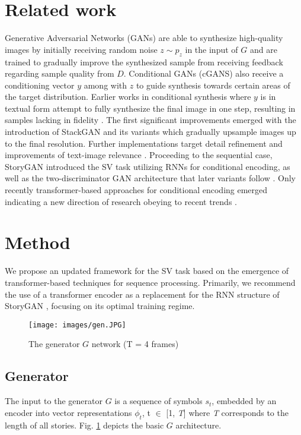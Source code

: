 \documentclass{article}
\begin{document}
\section{Related work}
\label{sec:literature}
Generative Adversarial Networks (GANs) \cite{goodfellow2014gans} are able to synthesize high-quality images by initially receiving random noise $z \sim  p_z$ in the input of $G$ and are trained to gradually improve the synthesized sample from receiving feedback regarding sample quality from $D$. Conditional GANs (cGANS) also receive a conditioning vector $y$ among with $z$ to guide synthesis towards certain areas of the target distribution. Earlier works in conditional synthesis where $y$ is in textual form attempt to fully synthesize the final image in one step, resulting in samples lacking in fidelity \cite{reed2016t2i}. The first significant improvements emerged with the introduction of StackGAN \cite{stackgan} and its variants \cite{zhang2018stackgan} which gradually upsample images up to the final resolution. Further implementations target detail refinement \cite{xu2018attngan, zhu2019dmgan} and improvements of text-image relevance \cite{segan}. Proceeding to the sequential case, StoryGAN \cite{storygan} introduced the SV task utilizing RNNs for conditional encoding, as well as the two-discriminator GAN architecture that later variants follow \cite{pororogan, li2020storygan}. Only recently transformer-based approaches for conditional encoding emerged \cite{Maharana2021ImprovingGA, Maharana2021IntegratingVL} indicating a new direction of research obeying to recent trends \cite{transformer}.

 
\section{Method}
\label{sec:method}
\label{sec:architecture}
We propose an updated framework for the SV task based on the emergence of transformer-based techniques for sequence processing. Primarily, we recommend the use of a transformer encoder \cite{transformer} as a replacement for the RNN structure of StoryGAN \cite{storygan}, focusing on its optimal training regime. 


\begin{figure}[b]
\centering
\texttt{[image: images/gen.JPG]}
\caption{The generator $G$ network (T = 4 frames)}
\label{fig:gen}
\end{figure}

\subsection{Generator}
The input to the generator $G$ is a sequence of symbols $s_t$, embedded by an encoder into vector representations $\phi_t$, t $\in$ [1, \textit{T}] where  \textit{T} corresponds to the length of all stories. Fig. \ref{fig:gen} depicts the basic $G$ architecture.
\end{document}
